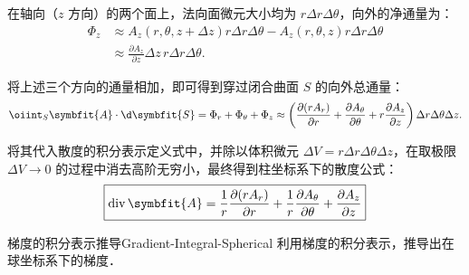 \begin{solution}
    在轴向（$z$ 方向）的两个面上，法向面微元大小均为 $r \Delta r \Delta \theta$，向外的净通量为：
    \begin{equation}
        \begin{aligned}
            \Phi_z & \approx A_z(r, \theta, z+\Delta z) r \Delta r \Delta \theta - A_z(r, \theta, z) r \Delta r \Delta \theta \\
                   & \approx \frac{\partial A_z}{\partial z} \Delta z \, r \Delta r \Delta \theta.
        \end{aligned}
    \end{equation}

    将上述三个方向的通量相加，即可得到穿过闭合曲面 $S$ 的向外总通量：
    \begin{equation}
        \oiint_{S} \symbfit{A} \cdot \d \symbfit{S} = \Phi_r + \Phi_\theta + \Phi_z \approx \left( \frac{\partial (r A_r)}{\partial r} + \frac{\partial A_\theta}{\partial \theta} + r \frac{\partial A_z}{\partial z} \right) \Delta r \Delta \theta \Delta z.
    \end{equation}

    将其代入散度的积分表示定义式中，并除以体积微元 $\Delta V = r \Delta r \Delta \theta \Delta z$，在取极限 $\Delta V \to 0$ 的过程中消去高阶无穷小，最终得到柱坐标系下的散度公式：
    \begin{equation}
        \boxed{\operatorname{div} \symbfit{A} = \frac{1}{r} \frac{\partial (r A_r)}{\partial r} + \frac{1}{r} \frac{\partial A_\theta}{\partial \theta} + \frac{\partial A_z}{\partial z}}
    \end{equation}
\end{solution}

\begin{problem}{梯度的积分表示推导}{Gradient-Integral-Spherical}
    利用梯度的积分表示，推导出在球坐标系下的梯度．
\end{problem}

